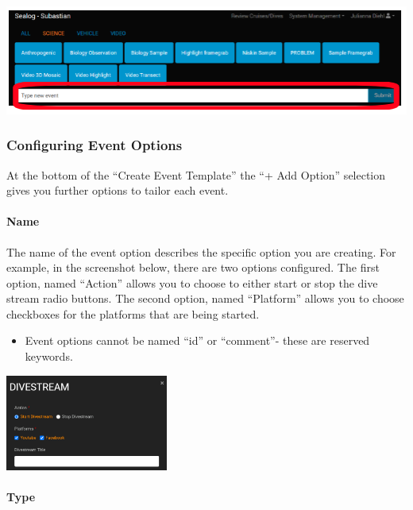 \documentclass[
  letterpaper,
  DIV=11,
  numbers=noendperiod]{scrreprt}
\let\oldparagraph\paragraph
\renewcommand{\paragraph}[1]{\oldparagraph{#1}\mbox{}}
\providecommand{\tightlist}{%
  \setlength{\itemsep}{0pt}\setlength{\parskip}{0pt}}\usepackage{longtable,booktabs,array}
\begin{document}
\includegraphics{images/freetext.png}

\hypertarget{configuring-event-options}{%
\subsubsection{Configuring Event
Options}\label{configuring-event-options}}

At the bottom of the ``Create Event Template'' the ``+ Add Option''
selection gives you further options to tailor each event.

\hypertarget{name}{%
\paragraph{Name}\label{name}}

The name of the event option describes the specific option you are
creating. For example, in the screenshot below, there are two options
configured. The first option, named ``Action'' allows you to choose to
either start or stop the dive stream radio buttons. The second option,
named ``Platform'' allows you to choose checkboxes for the platforms
that are being started.

\begin{itemize}
\tightlist
\item
  Event options cannot be named ``id'' or ``comment''- these are
  reserved keywords.
\end{itemize}

\includegraphics[width=0.4\textwidth,height=\textheight]{images/image8.png}

\hypertarget{type}{%
\paragraph{Type}\label{type}}
\end{document}
